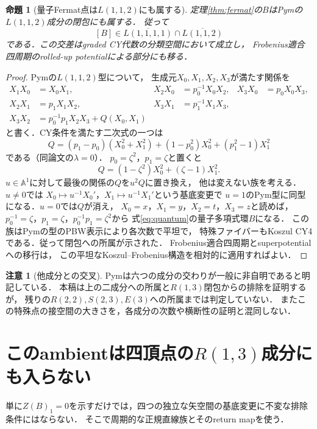 \documentclass[11pt,a4paper]{ltjsarticle}
\newtheorem{proposition}[theorem]{命題}
\theoremstyle{definition}\newtheorem{definition}[theorem]{定義}
\newtheorem{remark}[theorem]{注意}
\begin{document}
\begin{proposition}[量子Fermat点は$L(1,1,2)$にも属する]
\label{prop:fermat-in-L112}
定理\ref{thm:fermat}の$B$はPymの$L(1,1,2)$成分の閉包にも属する．
従って
\[
 [B]\in\overline{L(1,1,1,1)}\cap\overline{L(1,1,2)}
\]
である．この交差はgraded CY代数の分類空間において成立し，
Frobenius適合四周期のrolled-up potentialによる部分にも移る．
\end{proposition}
\begin{proof}
Pym\cite[\S3.2, 式(5)]{Pym}の$L(1,1,2)$型について，
生成元$X_0,X_1,X_2,X_3$が満たす関係を
\begin{align*}
 X_1X_0&=X_0X_1,
 &X_2X_0&=p_0^{-1}X_0X_2,
 &X_3X_0&=p_0X_0X_3,\\
 X_2X_1&=p_1X_1X_2,
 &X_3X_1&=p_1^{-1}X_1X_3,\\
 X_3X_2&=p_0^{-1}p_1X_2X_3+Q(X_0,X_1)
\end{align*}
と書く．CY条件を満たす二次式の一つは
\[
 Q=(p_1-p_0)(X_0^2+X_1^2)
   +(1-p_0^2)X_0^2+(p_1^2-1)X_1^2
\]
である（同論文の$\lambda=0$）．
$p_0=\zeta^2$，$p_1=\zeta$と置くと
\[
 Q=(1-\zeta^2)X_0^2+(\zeta-1)X_1^2.
\]
$u\in\mathbb A^1$に対して最後の関係の$Q$を$u^2Q$に置き換え，
他は変えない族を考える．$u\ne0$では
$X_0\mapsto u^{-1}X_0'$，$X_1\mapsto u^{-1}X_1'$という基底変更で
$u=1$のPym型に同型になる．$u=0$では$Q$が消え，
$X_0=x$，$X_1=y$，$X_2=t$，$X_3=z$と読めば，
$p_0^{-1}=\zeta$，$p_1=\zeta$，$p_0^{-1}p_1=\zeta^2$から
式\eqref{eq:quantum}の量子多項式環$B$になる．
この族はPymの型のPBW表示により各次数で平坦で，
特殊ファイバーもKoszul CY4である．従って閉包への所属が示された．
Frobenius適合四周期とsuperpotentialへの移行は，
この平坦なKoszul--Frobenius構造を相対的に適用すればよい．
\end{proof}

\begin{remark}[他成分との交叉]
Pymは六つの成分の交わりが一般に非自明であると明記している．
本稿は上の二成分への所属と$R(1,3)$閉包からの排除を証明するが，
残りの$R(2,2),S(2,3),E(3)$への所属までは判定していない．
またこの特殊点の接空間の大きさを，各成分の次数や横断性の証明と混同しない．
\end{remark}

\section{このambientは四頂点の$R(1,3)$成分にも入らない}
単に$Z(B)_1=0$を示すだけでは，四つの独立な矢空間の基底変更に不変な排除条件にはならない．
そこで周期的な正規直線族とそのreturn mapを使う．
\end{document}
